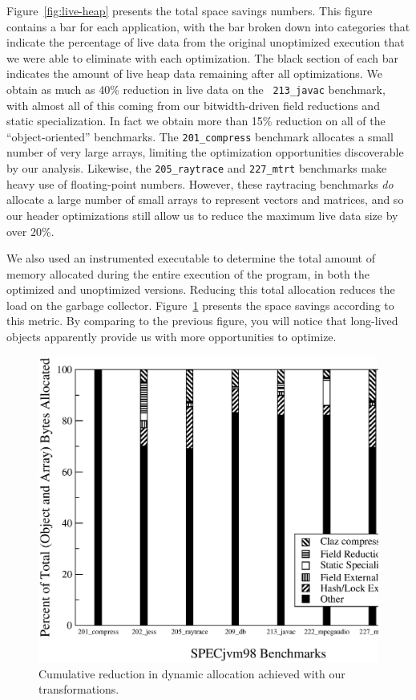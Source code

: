 \documentclass{acmconf}
\begin{document}
Figure~\ref{fig:live-heap} presents the total space savings numbers. This
figure contains a bar for each application, with the bar broken
down into categories that indicate the percentage of live data from 
the original unoptimized execution that we were able to eliminate
with each optimization. The black section of each bar indicates the
amount of live heap data remaining after all optimizations. 
We obtain as much as 40\% reduction in live data on the {\tt
  213\_javac} benchmark, with almost all of this coming from our
bitwidth-driven field reductions and static specialization.  In fact
we obtain more than 15\% reduction on all of the ``object-oriented''
benchmarks.  The {\tt 201\_compress} benchmark allocates a small
number of very large arrays, limiting the optimization opportunities
discoverable by our analysis.  Likewise, the {\tt 205\_raytrace} and
{\tt 227\_mtrt} benchmarks make heavy use of floating-point numbers.
However, these raytracing benchmarks {\it do} allocate a large number
of small arrays to represent vectors and matrices, and so our header
optimizations still allow us to reduce the maximum live data size by
over 20\%.

We also used an instrumented executable to determine the total amount
of memory allocated during the entire execution of the program, in
both the optimized and unoptimized versions.  Reducing this total
allocation reduces the load on the garbage collector.
Figure~\ref{fig:total-alloc} presents the space savings according to this
metric.  By comparing to the previous figure, you will notice that
long-lived objects apparently provide us with more opportunities to
optimize.

\begin{figure}
\includegraphics[scale=0.32,clip=true]{Figures/oopsla-ttlalloc.eps}
\caption{Cumulative reduction in dynamic allocation achieved with
  our transformations.}
\label{fig:total-alloc}
\end{figure}
\end{document}
